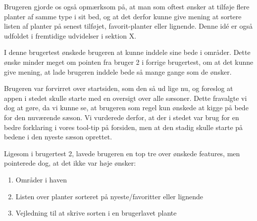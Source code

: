 Brugeren gjorde os også opmærksom på, at man som oftest ønsker at tilføje flere planter af samme type i sit bed, og at det derfor kunne give mening at sortere listen af planter på senest tilføjet, favorit-planter eller lignende. Denne idé er også udfoldet i fremtidige udvidelser i sektion X.

I denne brugertest ønskede brugeren at kunne inddele sine bede i områder. Dette ønske minder meget om pointen fra bruger 2 i forrige brugertest, om at det kunne give mening, at lade brugeren inddele bede så mange gange som de ønsker.

Brugeren var forvirret over startsiden, som den så ud lige nu, og foreslog at appen i stedet skulle starte med en oversigt over alle sæsoner. Dette fravalgte vi dog at gøre, da vi kunne se, at brugeren som regel kun ønskede at kigge på bede for den nuværende sæson. Vi vurderede derfor, at der i stedet var brug for en bedre forklaring i vores tool-tip på forsiden, men at den stadig skulle starte på bedene i den nyeste sæson oprettet.

Ligesom i brugertest 2, lavede brugeren en top tre over ønskede features, men pointerede dog, at det ikke var høje ønsker:

\begin{enumerate}
        \item Områder i haven
        \item Listen over planter sorteret på nyeste/favoritter eller lignende
        \item Vejledning til at skrive sorten i en brugerlavet plante 
\end{enumerate}


